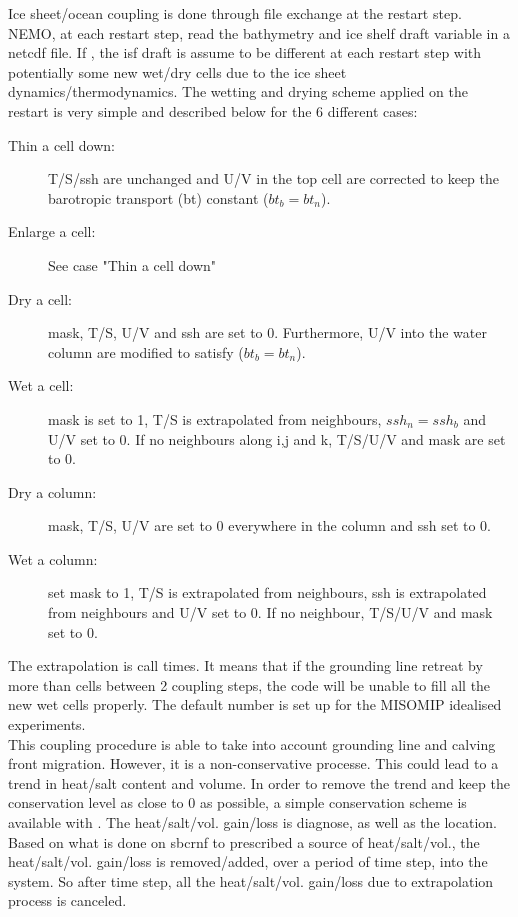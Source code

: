 \documentclass[../tex_main/NEMO_manual]{subfiles}
\begin{document}
Ice sheet/ocean coupling is done through file exchange at the restart step. NEMO, at each restart step, 
read the bathymetry and ice shelf draft variable in a netcdf file. 
If , the isf draft is assume to be different at each restart step 
with potentially some new wet/dry cells due to the ice sheet dynamics/thermodynamics.
The wetting and drying scheme applied on the restart is very simple and described below for the 6 different cases:
\begin{description}
\item[Thin a cell down:]
	T/S/ssh are unchanged and U/V in the top cell are corrected to keep the barotropic transport (bt) constant ($bt_b=bt_n$).
\item[Enlarge  a cell:]
	See case "Thin a cell down"
\item[Dry a cell:]
	mask, T/S, U/V and ssh are set to 0. Furthermore, U/V into the water column are modified to satisfy ($bt_b=bt_n$).
\item[Wet a cell:] 
	mask is set to 1, T/S is extrapolated from neighbours, $ssh_n = ssh_b$ and U/V set to 0. If no neighbours along i,j and k, T/S/U/V and mask are set to 0.
\item[Dry a column:]
	mask, T/S, U/V are set to 0 everywhere in the column and ssh set to 0.
\item[Wet a column:]
	set mask to 1, T/S is extrapolated from neighbours, ssh is extrapolated from neighbours and U/V set to 0. If no neighbour, T/S/U/V and mask set to 0.
\end{description}
The extrapolation is call  times. It means that if the grounding line retreat by more than  cells between 2 coupling steps,
 the code will be unable to fill all the new wet cells properly. The default number is set up for the MISOMIP idealised experiments.\\
This coupling procedure is able to take into account grounding line and calving front migration. However, it is a non-conservative processe. 
This could lead to a trend in heat/salt content and volume. In order to remove the trend and keep the conservation level as close to 0 as possible,
 a simple conservation scheme is available with . The heat/salt/vol. gain/loss is diagnose, as well as the location. 
Based on what is done on sbcrnf to prescribed a source of heat/salt/vol., the heat/salt/vol. gain/loss is removed/added,
 over a period of  time step, into the system. 
So after  time step, all the heat/salt/vol. gain/loss due to extrapolation process is canceled.\\
\end{document}
